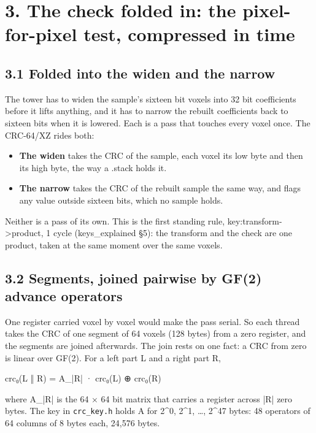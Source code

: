 \section{\texorpdfstring{3. The check folded in: the pixel-for-pixel test, compressed in time}{3. The check folded in: the pixel-for-pixel test, compressed in time}}

\subsection{\texorpdfstring{3.1 Folded into the widen and the narrow}{3.1 Folded into the widen and the narrow}}

The tower has to widen the sample's sixteen bit voxels into 32 bit coefficients before it lifts anything, and it has to narrow the rebuilt coefficients back to sixteen bits when it is lowered. Each is a pass that touches every voxel once. The CRC-64/XZ rides both:

\begin{itemize}
\item \textbf{The widen} takes the CRC of the sample, each voxel its low byte and then its high byte, the way a .stack holds it.
\item \textbf{The narrow} takes the CRC of the rebuilt sample the same way, and flags any value outside sixteen bits, which no sample holds.
\end{itemize}

Neither is a pass of its own. This is the first standing rule, key:transform->product, 1 cycle (keys\_\allowbreak{}explained §5): the transform and the check are one product, taken at the same moment over the same voxels.

\subsection{\texorpdfstring{3.2 Segments, joined pairwise by GF(2) advance operators}{3.2 Segments, joined pairwise by GF(2) advance operators}}

One register carried voxel by voxel would make the pass serial. So each thread takes the CRC of one segment of 64 voxels (128 bytes) from a zero register, and the segments are joined afterwards. The join rests on one fact: a CRC from zero is linear over GF(2). For a left part L and a right part R,

crc₀(L ‖ R)  =  A\_\allowbreak{}|R| · crc₀(L)  ⊕  crc₀(R)

where A\_\allowbreak{}|R| is the 64 × 64 bit matrix that carries a register across |R| zero bytes. The key in \texttt{crc\_\allowbreak{}key.\allowbreak{}h} holds A for 2\textasciicircum{}0, 2\textasciicircum{}1, …, 2\textasciicircum{}47 bytes: 48 operators of 64 columns of 8 bytes each, 24,576 bytes.

